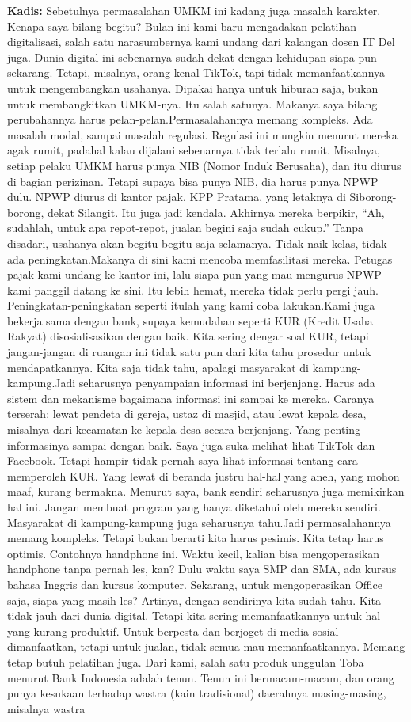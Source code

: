 {\noindent \textbf{Kadis:} Sebetulnya permasalahan UMKM ini kadang juga masalah karakter. Kenapa saya bilang begitu? Bulan ini kami baru mengadakan pelatihan digitalisasi, salah satu narasumbernya kami undang dari kalangan dosen IT Del juga. Dunia digital ini sebenarnya sudah dekat dengan kehidupan siapa pun sekarang. Tetapi, misalnya, orang kenal TikTok, tapi tidak memanfaatkannya untuk mengembangkan usahanya. Dipakai hanya untuk hiburan saja, bukan untuk membangkitkan UMKM-nya. Itu salah satunya. Makanya saya bilang perubahannya harus pelan-pelan.Permasalahannya memang kompleks. Ada masalah modal, sampai masalah regulasi. Regulasi ini mungkin menurut mereka agak rumit, padahal kalau dijalani sebenarnya tidak terlalu rumit. Misalnya, setiap pelaku UMKM harus punya NIB (Nomor Induk Berusaha), dan itu diurus di bagian perizinan. Tetapi supaya bisa punya NIB, dia harus punya NPWP dulu. NPWP diurus di kantor pajak, KPP Pratama, yang letaknya di Siborong-borong, dekat Silangit. Itu juga jadi kendala. Akhirnya mereka berpikir, ``Ah, sudahlah, untuk apa repot-repot, jualan begini saja sudah cukup.'' Tanpa disadari, usahanya akan begitu-begitu saja selamanya. Tidak naik kelas, tidak ada peningkatan.Makanya di sini kami mencoba memfasilitasi mereka. Petugas pajak kami undang ke kantor ini, lalu siapa pun yang mau mengurus NPWP kami panggil datang ke sini. Itu lebih hemat, mereka tidak perlu pergi jauh. Peningkatan-peningkatan seperti itulah yang kami coba lakukan.Kami juga bekerja sama dengan bank, supaya kemudahan seperti KUR (Kredit Usaha Rakyat) disosialisasikan dengan baik. Kita sering dengar soal KUR, tetapi jangan-jangan di ruangan ini tidak satu pun dari kita tahu prosedur untuk mendapatkannya. Kita saja tidak tahu, apalagi masyarakat di kampung-kampung.Jadi seharusnya penyampaian informasi ini berjenjang. Harus ada sistem dan mekanisme bagaimana informasi ini sampai ke mereka. Caranya terserah: lewat pendeta di gereja, ustaz di masjid, atau lewat kepala desa, misalnya dari kecamatan ke kepala desa secara berjenjang. Yang penting informasinya sampai dengan baik. Saya juga suka melihat-lihat TikTok dan Facebook. Tetapi hampir tidak pernah saya lihat informasi tentang cara memperoleh KUR. Yang lewat di beranda justru hal-hal yang aneh, yang mohon maaf, kurang bermakna. Menurut saya, bank sendiri seharusnya juga memikirkan hal ini. Jangan membuat program yang hanya diketahui oleh mereka sendiri. Masyarakat di kampung-kampung juga seharusnya tahu.Jadi permasalahannya memang kompleks. Tetapi bukan berarti kita harus pesimis. Kita tetap harus optimis. Contohnya handphone ini. Waktu kecil, kalian bisa mengoperasikan handphone tanpa pernah les, kan? Dulu waktu saya SMP dan SMA, ada kursus bahasa Inggris dan kursus komputer. Sekarang, untuk mengoperasikan Office saja, siapa yang masih les? Artinya, dengan sendirinya kita sudah tahu. Kita tidak jauh dari dunia digital. Tetapi kita sering memanfaatkannya untuk hal yang kurang produktif. Untuk berpesta dan berjoget di media sosial dimanfaatkan, tetapi untuk jualan, tidak semua mau memanfaatkannya. Memang tetap butuh pelatihan juga. Dari kami, salah satu produk unggulan Toba menurut Bank Indonesia adalah tenun. Tenun ini bermacam-macam, dan orang punya kesukaan terhadap wastra (kain tradisional) daerahnya masing-masing, misalnya wastra }
